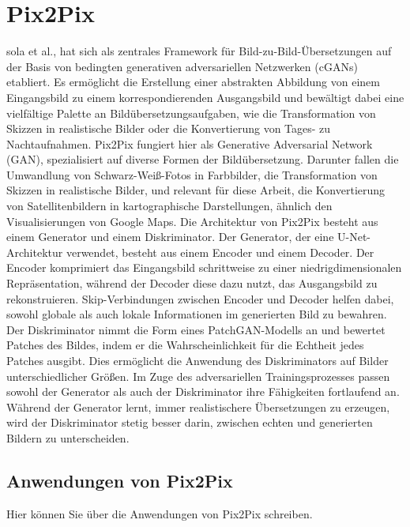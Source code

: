 \section{Pix2Pix}sola et al., hat sich als zentrales Framework für Bild-zu-Bild-Übersetzungen auf der Basis von bedingten generativen adversariellen Netzwerken (cGANs) etabliert. Es ermöglicht die Erstellung einer abstrakten Abbildung von einem Eingangsbild zu einem korrespondierenden Ausgangsbild und bewältigt dabei eine vielfältige Palette an Bildübersetzungsaufgaben, wie die Transformation von Skizzen in realistische Bilder oder die Konvertierung von Tages- zu Nachtaufnahmen. \newline
Pix2Pix fungiert hier als Generative Adversarial Network (GAN), spezialisiert auf diverse Formen der Bildübersetzung. Darunter fallen die Umwandlung von Schwarz-Weiß-Fotos in Farbbilder, die Transformation von Skizzen in realistische Bilder, und relevant für diese Arbeit, die Konvertierung von Satellitenbildern in kartographische Darstellungen, ähnlich den Visualisierungen von Google Maps. \newline	Die Architektur von Pix2Pix besteht aus einem Generator und einem Diskriminator. Der Generator, der eine U-Net-Architektur verwendet, besteht aus einem Encoder und einem Decoder. Der Encoder komprimiert das Eingangsbild schrittweise zu einer niedrigdimensionalen Repräsentation, während der Decoder diese dazu nutzt, das Ausgangsbild zu rekonstruieren. Skip-Verbindungen zwischen Encoder und Decoder helfen dabei, sowohl globale als auch lokale Informationen im generierten Bild zu bewahren. \newline
Der Diskriminator nimmt die Form eines PatchGAN-Modells an und bewertet Patches des Bildes, indem er die Wahrscheinlichkeit für die Echtheit jedes Patches ausgibt. Dies ermöglicht die Anwendung des Diskriminators auf Bilder unterschiedlicher Größen. Im Zuge des adversariellen Trainingsprozesses passen sowohl der Generator als auch der Diskriminator ihre Fähigkeiten fortlaufend an. Während der Generator lernt, immer realistischere Übersetzungen zu erzeugen, wird der Diskriminator stetig besser darin, zwischen echten und generierten Bildern zu unterscheiden.
  



\subsection{Anwendungen von Pix2Pix}
Hier können Sie über die Anwendungen von Pix2Pix schreiben.

